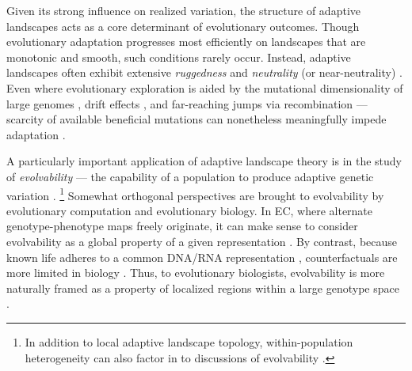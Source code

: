 Given its strong influence on realized variation, the structure of adaptive landscapes acts as a core determinant of evolutionary outcomes.
Though evolutionary adaptation progresses most efficiently on landscapes that are monotonic and smooth, such conditions rarely occur.
Instead, adaptive landscapes often exhibit extensive \textit{ruggedness} \citep{papkou2023rugged,reidys2001neutrality} and \textit{neutrality} (or near-neutrality) \citep{kimura1983neutral,kimura1991neutral,ohta1992nearly,ohta2002near}.
Even where evolutionary exploration is aided by the mutational dimensionality of large genomes \citep{franke2011evolutionary,greenbury2022structure}, drift effects \citep{reidys2001neutrality,ahnert2017structural,croitoru2022punctuated,galvanlopez2011neutrality,jorg2008neutral,huynen1996smoothness,shackleton2000investigation,huynen1996exploring,amitai2007latent,banzhaf2006evolution,hu2025neutrality,oliveto2017how,wagner2008robustness,wagner2013robustness,masel2010robustness,hu2018neutrality}, and far-reaching jumps via recombination \citep{li2024rapid,doerr2008crossover,fogel1994effectiveness} --- scarcity of available beneficial mutations can nonetheless meaningfully impede adaptation \citep{martin2013multiple,steinberg2016environmental,li2025probability,bank2022epistasis,neidhart2014adaptation,orr2005genetic,bershtein2008advances,van1999neutral}.

A particularly important application of adaptive landscape theory is in the study of \textit{evolvability} --- the capability of a population to produce adaptive genetic variation \citep{payne2018causes,kirschner1998evolvability,wilder2015reconciling,pigliucci2008evolvability}.
\unskip\footnote{%
In addition to local adaptive landscape topology, within-population heterogeneity can also factor in to discussions of evolvability \citep{wilder2015reconciling,houle1992comparing}.
}
Somewhat orthogonal perspectives are brought to evolvability by evolutionary computation and evolutionary biology.
In EC, where alternate genotype-phenotype maps freely originate, it can make sense to consider evolvability as a global property of a given representation \citep{tarapore2015evolvability}.
By contrast, because known life adheres to a common DNA/RNA representation \citep{aguirre2018networked}, counterfactuals are more limited in biology \citep{zhang2015evolution}.
Thus, to evolutionary biologists, evolvability is more naturally framed as a property of localized regions within a large genotype space \citep{wagner2017information,wagner2023evolvability}.

